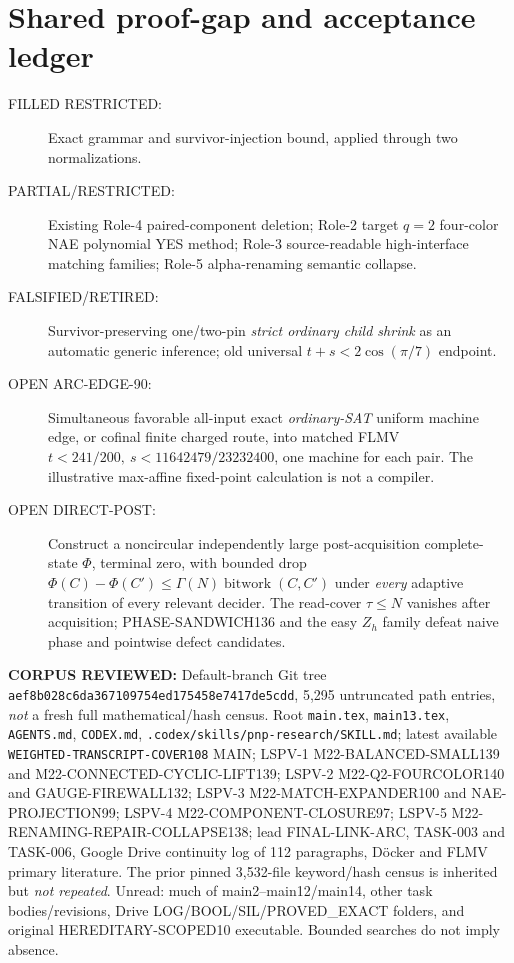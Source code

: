 \documentclass[11pt]{article}
\begin{document}
\section{Shared proof-gap and acceptance ledger}
\begin{description}
\item[FILLED RESTRICTED:] Exact grammar and survivor-injection bound, applied through two normalizations.
\item[PARTIAL/RESTRICTED:] Existing Role-4 paired-component deletion; Role-2 target \(q=2\) four-color NAE polynomial YES method; Role-3 source-readable high-interface matching families; Role-5 alpha-renaming semantic collapse.
\item[FALSIFIED/RETIRED:] Survivor-preserving one/two-pin \emph{strict ordinary child shrink} as an automatic generic inference; old universal \(t+s<2\cos(\pi/7)\) endpoint.
\item[OPEN ARC-EDGE-90:] Simultaneous favorable all-input exact \emph{ordinary-SAT} uniform machine edge, or cofinal finite charged route, into matched FLMV \(t<241/200,\ s<11642479/23232400\), one machine for each pair. The illustrative max-affine fixed-point calculation is not a compiler.
\item[OPEN DIRECT-POST:] Construct a noncircular independently large post-acquisition complete-state \(\Phi\), terminal zero, with bounded drop \(\Phi(C)-\Phi(C')\le\Gamma(N)\operatorname{bitwork}(C,C')\) under \emph{every} adaptive transition of every relevant decider. The read-cover \(\tau\le N\) vanishes after acquisition; PHASE-SANDWICH136 and the easy \(Z_h\) family defeat naive phase and pointwise defect candidates.
\end{description}

\noindent\textbf{CORPUS REVIEWED:} Default-branch Git tree \texttt{aef8b028c6da367109754ed175458e7417de5cdd}, 5,295 untruncated path entries, \emph{not} a fresh full mathematical/hash census. Root \texttt{main.tex}, \texttt{main13.tex}, \texttt{AGENTS.md}, \texttt{CODEX.md}, \texttt{.codex/skills/pnp-research/SKILL.md}; latest available \texttt{WEIGHTED-TRANSCRIPT-COVER108} MAIN; LSPV-1 M22-BALANCED-SMALL139 and M22-CONNECTED-CYCLIC-LIFT139; LSPV-2 M22-Q2-FOURCOLOR140 and GAUGE-FIREWALL132; LSPV-3 M22-MATCH-EXPANDER100 and NAE-PROJECTION99; LSPV-4 M22-COMPONENT-CLOSURE97; LSPV-5 M22-RENAMING-REPAIR-COLLAPSE138; lead FINAL-LINK-ARC, TASK-003 and TASK-006, Google Drive continuity log of 112 paragraphs, D\"ocker and FLMV primary literature. The prior pinned 3,532-file keyword/hash census is inherited but \emph{not repeated}. Unread: much of main2--main12/main14, other task bodies/revisions, Drive LOG/BOOL/SIL/PROVED\_EXACT folders, and original HEREDITARY-SCOPED10 executable. Bounded searches do not imply absence.
\end{document}
